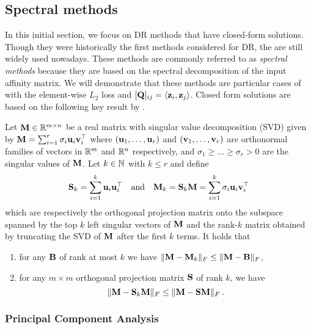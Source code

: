 \subsection{Spectral methods}\label{sec:spectral_methods}

In this initial section, we focus on DR methods that have closed-form solutions. Though they were historically the first methods considered for DR, the are still widely used nowadays. These methods are commonly referred to as \emph{spectral methods} because they are based on the spectral decomposition of the input affinity matrix. We will demonstrate that these methods are particular cases of  with the element-wise $L_2$ loss and $[{\mathbf{Q}}]_{ij} = \langle {\mathbf{z}}_i, {\mathbf{z}}_j \rangle$. Closed form solutions are based on the following key result by \cite{eckart1936approximation}.

\begin{theorem}{\cite{eckart1936approximation}}\label{thm:eckart}
	Let ${\mathbf{M}} \in \mathbb{R}^{m \times n}$ be a real matrix with singular value decomposition (SVD) given by ${\mathbf{M}} = \sum_{i=1}^{r} \sigma_i {\mathbf{u}}_i {\mathbf{v}}_i^\top$ where $({\mathbf{u}}_1, \dots, {\mathbf{u}}_r)$ and $({\mathbf{v}}_1, \dots, {\mathbf{v}}_r)$ are orthonormal families of vectors in $\mathbb{R}^m$ and $\mathbb{R}^n$ respectively, and $\sigma_1 \geq \dots \geq \sigma_r > 0$ are the singular values of ${\mathbf{M}}$. Let $k \in \mathbb{N}$ with $k \leq r$ and define 
	\begin{align}
		{\mathbf{S}}_k = \sum_{i=1}^{k} {\mathbf{u}}_i {\mathbf{u}}_i^\top \quad \text{and} \quad {\mathbf{M}}_k = {\mathbf{S}}_k {\mathbf{M}} = \sum_{i=1}^{k} \sigma_i {\mathbf{u}}_i {\mathbf{v}}_i^\top
	\end{align}
	which are respectively the orthogonal projection matrix onto the subspace spanned by the top $k$ left singular vectors of ${\mathbf{M}}$ and the rank-$k$ matrix obtained by truncating the SVD of ${\mathbf{M}}$ after the first $k$ terms. It holds that
	\begin{enumerate}[label=(\alph*)]
        \item for any ${\mathbf{B}}$ of rank at most $k$ we have $\| {\mathbf{M}} - {\mathbf{M}}_k \|_F \leq \| {\mathbf{M}} - {\mathbf{B}} \|_F$,
        \item for any $m \times m$ orthogonal projection matrix ${\mathbf{S}}$ of rank $k$, we have $$\| {\mathbf{M}} - {\mathbf{S}}_k {\mathbf{M}} \|_F \leq \| {\mathbf{M}} - {\mathbf{S}} {\mathbf{M}} \|_F \: .$$
    \end{enumerate} 
\end{theorem}

\subsubsection{Principal Component Analysis}

